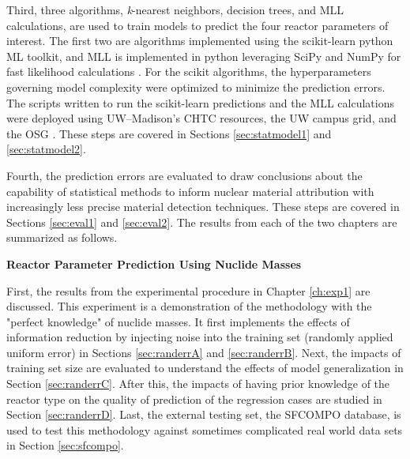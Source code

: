 Third, three algorithms, \textit{k}-nearest neighbors, decision trees, and
\gls{MLL} calculations, are used to train models to predict the four reactor
parameters of interest.  The first two are algorithms implemented using the
scikit-learn python \gls{ML} toolkit, and \gls{MLL} is implemented in python
leveraging SciPy and NumPy for fast likelihood calculations \cite{scikit,
scipy, numpy}.  For the scikit algorithms, the hyperparameters governing model
complexity were optimized to minimize the prediction errors.  The scripts
written to run the scikit-learn predictions and the \gls{MLL} calculations were
deployed using \gls{UW}--Madison's \gls{CHTC} resources, the \gls{UW} campus
grid, and the \gls{OSG} \cite{osg07, osg09}.  These steps are covered in
Sections \ref{sec:statmodel1} and \ref{sec:statmodel2}.

Fourth, the prediction errors are evaluated to draw conclusions about the
capability of statistical methods to inform nuclear material attribution with
increasingly less precise material detection techniques.  These steps are
covered in Sections \ref{sec:eval1} and \ref{sec:eval2}.  The results from each
of the two chapters are summarized as follows.

\noindent \textbf{Reactor Parameter Prediction Using Nuclide Masses}

First, the results from the experimental procedure in Chapter \ref{ch:exp1} are
discussed.  This experiment is a demonstration of the methodology with the
"perfect knowledge" of nuclide masses. It first implements the effects of
information reduction by injecting noise into the training set (randomly
applied uniform error) in Sections \ref{sec:randerrA} and \ref{sec:randerrB}.
Next, the impacts of training set size are evaluated to understand the effects
of model generalization in Section \ref{sec:randerrC}. After this, the impacts
of having prior knowledge of the reactor type on the quality of prediction of
the regression cases are studied in Section \ref{sec:randerrD}. Last, the
external testing set, the \gls{SFCOMPO} database, is used to test this
methodology against sometimes complicated real world data sets in Section
\ref{sec:sfcompo}. 


